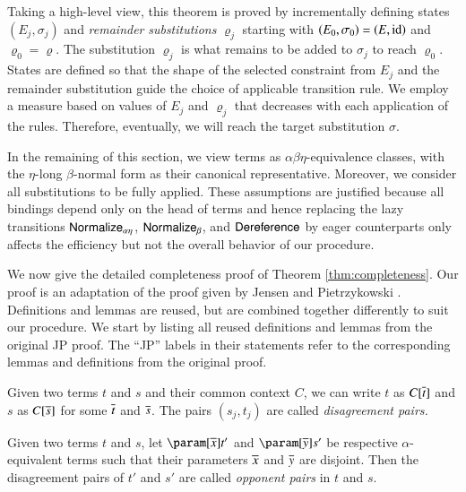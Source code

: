 Taking a high-level view, this theorem is proved by incrementally defining states
$(E_{j},\sigma_{j})$ and \emph{remainder} \emph{substitutions}
$\varrho_{j}$ starting with
$\left(E_{0},\sigma_{0}\right)=\left(E,\makeop{id}\right)$ and
$\varrho_{0}=\varrho$. The substitution $\varrho_{j}$ is what remains to be added
to $\sigma_{j}$ to reach $\varrho_{0}$. States are defined
so that the shape of the selected constraint from $E_{j}$ and the remainder
substitution guide the choice of applicable transition rule.
We employ a measure based on values of $E_j$ and $\varrho_j$ that decreases with 
each application of the rules. Therefore, eventually, we will reach the target substitution
$\sigma$.

In the remaining of this section, we view terms as
$\alpha\beta\eta$-equivalence classes, with the $\eta$-long $\beta$-normal
form as their canonical representative. Moreover, we consider all
substitutions to be fully applied. These assumptions are justified because
all bindings depend only on the head of terms and hence replacing the lazy
transitions $\textsf{Normalize}_{\alpha\eta}$,
$\textsf{Normalize}_{\beta}$, and $\textsf{Dereference}$ by eager
counterparts only affects the efficiency but not the overall behavior of our
procedure.

We now give the detailed completeness proof of Theorem \ref{thm:completeness}.
Our proof is an adaptation of the proof given by Jensen and Pietrzykowski
\cite{jp-76-unif}.
Definitions and lemmas are reused, but are combined together differently to
suit our procedure. We start by listing all reused definitions and lemmas
from the original JP proof. The ``JP'' labels in
their statements refer to the corresponding lemmas and definitions from
the original proof.

\begin{defi}[{$\jp[1]D6$}] \label{unif:def:disagreement-pairs}
Given two terms $t$ and $s$ and their common context $C$, 
we can write $t$ as $C[\overline{t}]$ and $s$ as $C[\overline{s}]$
for some $\overline{t}$ and $\overline{s}$.
The pairs $(s_{j},t_{j})$ are called \emph{disagreement pairs.}
\end{defi}
\begin{defi}
[$\jp D1$]\label{unif:def:opponents}
Given two terms $t$ and $s$,
let $\param[\seq x] t'$ and $\param[\seq y] s'$ 
be respective $\alpha$-equivalent terms such that
their parameters $\overline{x}$ and $\overline{y}$ are disjoint.
Then the disagreement pairs of $t'$ and $s'$ are called 
\emph{opponent pairs} in $t$ and $s$.
\end{defi}


